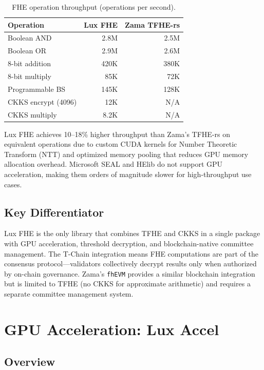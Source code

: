 \documentclass[11pt,twocolumn]{article}
\begin{document}
\begin{table}[H]
\centering
\caption{FHE operation throughput (operations per second).}
\footnotesize
\begin{tabular}{@{}lrr@{}}
\toprule
Operation & Lux FHE & Zama TFHE-rs \\
\midrule
Boolean AND & 2.8M & 2.5M \\
Boolean OR & 2.9M & 2.6M \\
8-bit addition & 420K & 380K \\
8-bit multiply & 85K & 72K \\
Programmable BS & 145K & 128K \\
CKKS encrypt (4096) & 12K & N/A \\
CKKS multiply & 8.2K & N/A \\
\bottomrule
\end{tabular}
\end{table}

Lux FHE achieves 10--18\% higher throughput than Zama's TFHE-rs on equivalent operations due to custom CUDA kernels for Number Theoretic Transform (NTT) and optimized memory pooling that reduces GPU memory allocation overhead. Microsoft SEAL and HElib do not support GPU acceleration, making them orders of magnitude slower for high-throughput use cases.

\subsection{Key Differentiator}

Lux FHE is the only library that combines TFHE and CKKS in a single package with GPU acceleration, threshold decryption, and blockchain-native committee management. The T-Chain integration means FHE computations are part of the consensus protocol---validators collectively decrypt results only when authorized by on-chain governance. Zama's \texttt{fhEVM} provides a similar blockchain integration but is limited to TFHE (no CKKS for approximate arithmetic) and requires a separate committee management system.

\section{GPU Acceleration: Lux Accel}
\label{sec:gpu}

\subsection{Overview}
\end{document}
